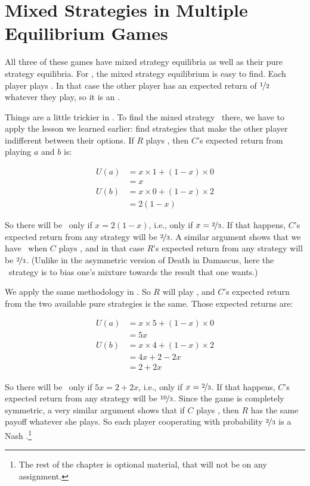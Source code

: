 \section{Mixed Strategies in Multiple Equilibrium Games}

All three of these games have mixed strategy equilibria as well as their pure strategy equilibria. For , the mixed strategy equilibrium is easy to find. Each player plays . In that case the other player has an expected return of $\nicefrac{1}{2}$ whatever they play, so it is an \eqm.

Things are a little trickier in . To find the mixed strategy \eqm\ there, we have to apply the lesson we learned earlier: find strategies that make the other player indifferent between their options. If $R$ plays , then $C$'s expected return from playing $a$ and $b$ is:

\begin{align*}
U(a) &= x \times 1 + (1-x) \times 0 \\
 &= x \\
U(b) &= x \times 0 + (1-x) \times 2 \\
 &= 2(1-x)
\end{align*}

\noindent So there will be \eqm\ only if $x = 2(1-x)$, i.e., only if $x = \nicefrac{2}{3}$. If that happens, $C$'s expected return from any strategy will be $\nicefrac{2}{3}$. A similar argument shows that we have \eqm\ when $C$ plays , and in that case $R$'s expected return from any strategy will be $\nicefrac{2}{3}$. (Unlike in the asymmetric version of Death in Damascus, here the \eqm\ strategy is to bias one's mixture towards the result that one wants.)

We apply the same methodology in . So $R$ will play , and $C$'s expected return from the two available pure strategies is the same. Those expected returns are:

\begin{align*}
U(a) &= x \times 5 + (1-x) \times 0 \\
 &= 5x \\
U(b) &= x \times 4 + (1-x) \times 2 \\
 &= 4x + 2 - 2x \\
 &= 2 + 2x
\end{align*}

\noindent So there will be \eqm\ only if $5x = 2 + 2x$, i.e., only if $x = \nicefrac{2}{3}$. If that happens, $C$'s expected return from any strategy will be $\nicefrac{10}{3}$. Since the game is completely symmetric, a very similar argument shows that if $C$ plays , then $R$ has the same payoff whatever she plays. So each player cooperating with probability $\nicefrac{2}{3}$ is a Nash \eqm.\footnote{The rest of the chapter is optional material, that will not be on any assignment.}

